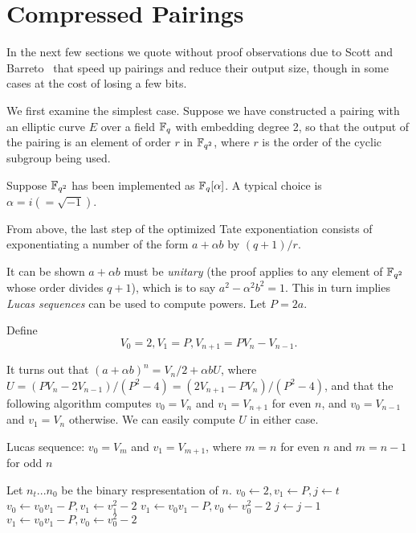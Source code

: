 \section {\label{sec:compressedpairings}Compressed Pairings}

In the next few sections we quote without proof observations
due to Scott and Barreto~\cite{compressedpairings} that speed up pairings and
reduce their output size, though in some cases at the cost of losing a few bits.

We first examine the simplest case.
Suppose we have constructed a pairing
with an elliptic curve $E$ over a field $\mathbb{F}_q$ with embedding degree 2,
so that the output of the pairing is an element of order $r$
in $\mathbb{F}_{q^2}$, where $r$ is the order of the cyclic subgroup being used.

Suppose $\mathbb{F}_{q^2}$ has been implemented as $\mathbb{F}_q[\alpha]$.
A typical choice is $\alpha = i (=\sqrt{-1})$.

From above, the last step of the optimized Tate exponentiation
consists of exponentiating a number of the form $a + \alpha b$ by
$(q + 1) / r$.

It can be shown $a + \alpha b$ must be \emph {unitary} (the proof
applies to any element of $\mathbb{F}_{q^2}$ whose order divides $q+1$), which
is to say $a^2 - \alpha^2 b^2 = 1$. This in turn implies
\emph{Lucas sequences} can be used to compute powers. Let $P = 2a$.

Define
\[ V_0 = 2, V_1 = P, V_{n+1} = P V_n - V_{n-1} . \]

It turns out that $(a+\alpha b)^n = V_n / 2 + \alpha b U$,
where $U = (P V_n - 2 V_{n-1}) / (P^2 - 4)
= (2 V_{n+1} - P V_n) / (P^2 - 4)$,
and that the following algorithm
computes $v_0 = V_n$ and $v_1 = V_{n+1}$ for even $n$,
and $v_0 = V_{n-1}$ and $v_1 = V_n$ otherwise.
We can easily compute $U$ in either case.

\begin{algorithm}
\caption {Lucas sequence: $v_0 = V_m$ and $v_1 = V_{m+1}$,
where $m = n$ for even $n$ and $m = n-1$ for odd $n$}
\begin{algorithmic}[1]
\STATE Let $n_t ... n_0$ be the binary respresentation of $n$.
\STATE $v_0 \gets 2, v_1 \gets P, j \gets t$
	\STATE $v_0 \gets v_0 v_1 - P, v_1 \gets v_1^2 - 2$
    \ELSE
	\STATE $v_1 \gets v_0 v_1 - P, v_0 \gets v_0^2 - 2$
    \ENDIF
    \STATE $j \gets j - 1$
\ENDWHILE
\STATE $v_1 \gets v_0 v_1 - P, v_0 \gets v_0^2 - 2$
\end{algorithmic}
\end{algorithm}

